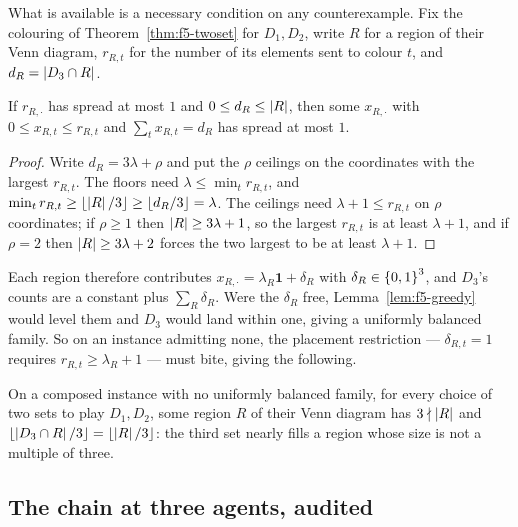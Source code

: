 What is available is a necessary condition on any counterexample. Fix the
colouring of Theorem~\ref{thm:f5-twoset} for $D_1,D_2$, write $R$ for a region
of their Venn diagram, $r_{R,t}$ for the number of its elements sent to colour
$t$, and $d_R = \left\lvert D_3 \cap R\right\rvert$.

\begin{lemma}
\label{lem:f5-inregion}
If $r_{R,\cdot}$ has spread at most $1$ and $0 \le d_R \le \left\lvert R\right\rvert$, then some
$x_{R,\cdot}$ with $0 \le x_{R,t} \le r_{R,t}$ and $\sum_t x_{R,t} = d_R$ has
spread at most $1$.
\end{lemma}

\begin{proof}
Write $d_R = 3\lambda + \rho$ and put the $\rho$ ceilings on the coordinates with
the largest $r_{R,t}$. The floors need $\lambda \le \min_t r_{R,t}$, and
$\min_t r_{R,t} \ge \lfloor \left\lvert R\right\rvert/3\rfloor \ge \lfloor d_R/3\rfloor = \lambda$.
The ceilings need $\lambda + 1 \le r_{R,t}$ on $\rho$ coordinates; if $\rho \ge
1$ then $\left\lvert R\right\rvert \ge 3\lambda+1$, so the largest $r_{R,t}$ is at least
$\lambda+1$, and if $\rho = 2$ then $\left\lvert R\right\rvert \ge 3\lambda+2$ forces the two
largest to be at least $\lambda+1$.
\end{proof}

Each region therefore contributes $x_{R,\cdot} = \lambda_R \mathbf 1 + \delta_R$
with $\delta_R \in \left\{0,1\right\}^3$, and $D_3$'s counts are a constant plus
$\sum_R \delta_R$. Were the $\delta_R$ free, Lemma~\ref{lem:f5-greedy} would
level them and $D_3$ would land within one, giving a uniformly balanced family.
So on an instance admitting none, the placement restriction --- $\delta_{R,t}=1$
requires $r_{R,t} \ge \lambda_R + 1$ --- must bite, giving the following.

\begin{corollary}
\label{cor:f5-counterex-shape}
On a composed instance with no uniformly balanced family, for every choice of two
sets to play $D_1,D_2$, some region $R$ of their Venn diagram has
$3 \nmid \left\lvert R\right\rvert$ and $\lfloor \left\lvert D_3 \cap R\right\rvert/3\rfloor = \lfloor \left\lvert R\right\rvert/3
\rfloor$: the third set nearly fills a region whose size is not a multiple of
three.
\end{corollary}

\subsection{The chain at three agents, audited}
\label{sec:f5-audit}

